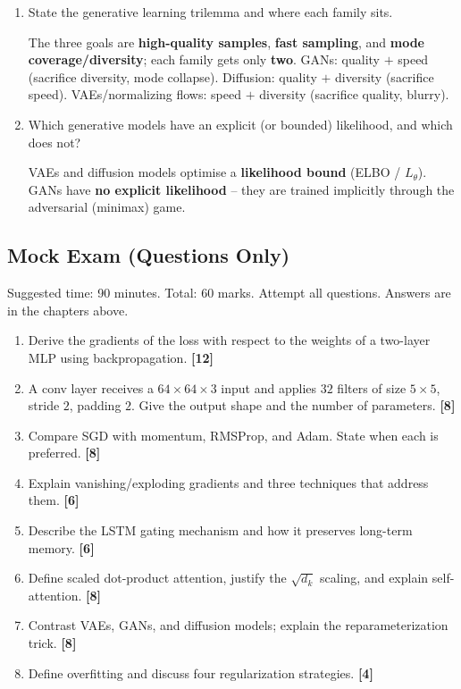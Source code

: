 \documentclass[10pt,a4paper]{article}
\newcommand{\q}[1]{\item #1}
\begin{document}
\begin{enumerate}[leftmargin=*,label=\textbf{Q\arabic*.}]
\q State the generative learning trilemma and where each family sits.
\begin{answerbox}
The three goals are \textbf{high-quality samples}, \textbf{fast sampling}, and \textbf{mode coverage/diversity}; each family gets only \textbf{two}. GANs: quality $+$ speed (sacrifice diversity, mode collapse). Diffusion: quality $+$ diversity (sacrifice speed). VAEs/normalizing flows: speed $+$ diversity (sacrifice quality, blurry).
\end{answerbox}

\q Which generative models have an explicit (or bounded) likelihood, and which does not?
\begin{answerbox}
VAEs and diffusion models optimise a \textbf{likelihood bound} (ELBO / $L_\theta$). GANs have \textbf{no explicit likelihood} -- they are trained implicitly through the adversarial (minimax) game.
\end{answerbox}

\end{enumerate}


\newpage
\subsection{Mock Exam (Questions Only)}

\begin{importantbox}
Suggested time: 90 minutes. Total: 60 marks. Attempt all questions. Answers are in the chapters above.
\end{importantbox}

\begin{enumerate}[leftmargin=*,label=\textbf{\arabic*.}]
    \item Derive the gradients of the loss with respect to the weights of a two-layer MLP using backpropagation. \hfill\textbf{[12]}
    \item A conv layer receives a $64\times64\times3$ input and applies $32$ filters of size $5\times5$, stride $2$, padding $2$. Give the output shape and the number of parameters. \hfill\textbf{[8]}
    \item Compare SGD with momentum, RMSProp, and Adam. State when each is preferred. \hfill\textbf{[8]}
    \item Explain vanishing/exploding gradients and three techniques that address them. \hfill\textbf{[6]}
    \item Describe the LSTM gating mechanism and how it preserves long-term memory. \hfill\textbf{[6]}
    \item Define scaled dot-product attention, justify the $\sqrt{d_k}$ scaling, and explain self-attention. \hfill\textbf{[8]}
    \item Contrast VAEs, GANs, and diffusion models; explain the reparameterization trick. \hfill\textbf{[8]}
    \item Define overfitting and discuss four regularization strategies. \hfill\textbf{[4]}
\end{enumerate}
\end{document}
